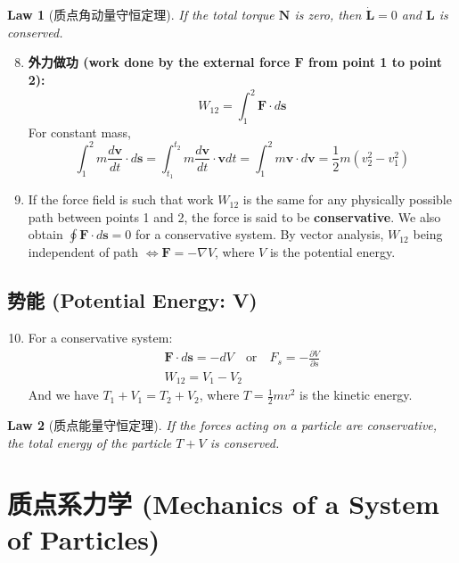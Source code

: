 \documentclass[12pt,a4paper]{article}
\newtheorem{law}{Law}[section]
\theoremstyle{definition}
\theoremstyle{remark}
\renewcommand{\vec}[1]{\mathbf{#1}}
\begin{document}
	\begin{law}[质点角动量守恒定理]
		If the total torque $\vec{N}$ is zero, then $\dot{\vec{L}}=0$ and $\vec{L}$ is conserved.
	\end{law}
	
	\begin{enumerate}
		\setcounter{enumi}{7}
		\item \textbf{外力做功 (work done by the external force $\vec{F}$ from point 1 to point 2):}
		\begin{equation*}
			W_{12} = \int_{1}^{2} \vec{F} \cdot d\vec{s}
		\end{equation*}
		For constant mass,
		\begin{equation*}
			\int_{1}^{2} m\frac{d\vec{v}}{dt} \cdot d\vec{s} = \int_{t_1}^{t_2} m\frac{d\vec{v}}{dt} \cdot \vec{v}dt = \int_{1}^{2} m\vec{v} \cdot d\vec{v} = \frac{1}{2}m(v_2^2 - v_1^2)
		\end{equation*}
		\item If the force field is such that work $W_{12}$ is the same for any physically possible path between points 1 and 2, the force is said to be \textbf{conservative}.
		We also obtain $\oint \vec{F} \cdot d\vec{s} = 0$ for a conservative system. By vector analysis, $W_{12}$ being independent of path $\iff \vec{F} = -\nabla V$, where $V$ is the potential energy.
	\end{enumerate}
	
	\subsection{势能 (Potential Energy: V)}
	\begin{enumerate}
		\setcounter{enumi}{9}
		\item For a conservative system:
		\begin{gather*}
			\vec{F} \cdot d\vec{s} = -dV \quad \text{or} \quad F_s = -\frac{\partial V}{\partial s} \\
			W_{12} = V_1 - V_2
		\end{gather*}
		And we have $T_1 + V_1 = T_2 + V_2$, where $T = \frac{1}{2}mv^2$ is the kinetic energy.
	\end{enumerate}
	
	\begin{law}[质点能量守恒定理]
		If the forces acting on a particle are conservative, the total energy of the particle $T+V$ is conserved.
	\end{law}
	
	
	\section{质点系力学 (Mechanics of a System of Particles)}
	
\end{document}
